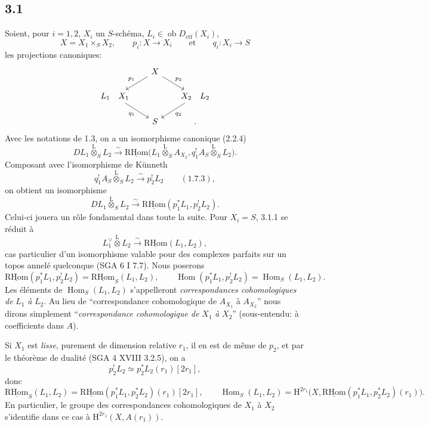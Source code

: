 \documentclass[11pt]{article}
\renewcommand{\H}{\mathrm{H}}
\DeclareMathOperator{\Hom}{Hom}
\newcommand{\R}{\mathrm{R}}\newcommand{\RHomCore}{\mathrm{RHom}}
\newcommand{\ob}{\operatorname{ob}}
\providecommand{\RHom}{\RHomCore}
\providecommand{\uRHom}{\underline{\RHom}}
\providecommand{\Dctf}{D_{\mathrm{ctf}}}
\providecommand{\Dctf}{D_{\mathrm{ctf}}}
\providecommand{\RHom}{\RHomCore}
\providecommand{\Hom}{\operatorname{Hom}}
\providecommand{\ob}{\operatorname{ob}}
\providecommand{\RHom}{\R\mathcal{H}om}
\providecommand{\R}{\mathrm R}
\providecommand{\RHom}{\RHomCore}
\providecommand{\Hom}{\operatorname{Hom}}
\begin{document}
\subsection*{3.1}
Soient, pour $i=1,2$, $X_i$ un $S$-schéma, $L_i\in\ob\Dctf(X_i)$,
\[
X=X_1\times_S X_2,
\qquad
p_i:X\longrightarrow X_i
\qquad\text{et}\qquad
q_i:X_i\longrightarrow S
\]
les projections canoniques:
\[
\begin{tikzcd}[column sep=1.8em,row sep=1.5em]
& X \arrow[dl,"p_1"'] \arrow[dr,"p_2"] & \\
L_1\quad X_1 \arrow[dr,"q_1"'] & & X_2\quad L_2 \arrow[dl,"q_2"] \\
& S & .
\end{tikzcd}
\]
Avec les notations de 1.3, on a un isomorphisme canonique (2.2.4)
\[
DL_1\overset{\mathrm{L}}{\otimes}_S L_2
\xrightarrow{\sim}
\uRHom\bigl(L_1\overset{\mathrm{L}}{\otimes}_S A_{X_2},
q_1^!A_S\overset{\mathrm{L}}{\otimes}_S L_2\bigr).
\]
Composant avec l'isomorphisme de Künneth
\[
q_1^!A_S\overset{\mathrm{L}}{\otimes}_S L_2
\xrightarrow{\sim}p_2^!L_2 \qquad (1.7.3),
\]
on obtient un isomorphisme
\begin{equation}
DL_1\overset{\mathrm{L}}{\otimes}_S L_2
\xrightarrow{\sim}
\uRHom(p_1^*L_1,p_2^!L_2).
\tag{3.1.1}
\end{equation}
Celui-ci jouera un rôle fondamental dans toute la suite. Pour $X_i=S$, 3.1.1 se réduit à
\[
L_1^\vee\overset{\mathrm{L}}{\otimes}L_2\xrightarrow{\sim}\uRHom(L_1,L_2),
\]
cas particulier d'un isomorphisme valable pour des complexes parfaits sur un topos annelé quelconque (SGA 6 I 7.7). Nous poserons
\begin{equation}
\uRHom(p_1^*L_1,p_2^!L_2)=\uRHom_S(L_1,L_2),
\qquad
\Hom(p_1^*L_1,p_2^!L_2)=\Hom_S(L_1,L_2).
\tag{3.1.2}
\end{equation}
Les éléments de $\Hom_S(L_1,L_2)$ s'appelleront \emph{correspondances cohomologiques de} $L_1$ \emph{à} $L_2$. Au lieu de ``correspondance cohomologique de $A_{X_1}$ à $A_{X_2}$'' nous dirons simplement ``\emph{correspondance cohomologique de} $X_1$ \emph{à} $X_2$'' (sous-entendu: à coefficients dans $A$).

Si $X_1$ est \emph{lisse}, purement de dimension relative $r_1$, il en est de même de $p_2$, et par le théorème de dualité (SGA 4 XVIII 3.2.5), on a
\[
p_2^!L_2\simeq p_2^*L_2(r_1)[2r_1],
\]
donc
\begin{equation}
\uRHom_S(L_1,L_2)=\uRHom(p_1^*L_1,p_2^*L_2)(r_1)[2r_1],
\qquad
\Hom_S(L_1,L_2)=\H^{2r_1}\bigl(X,\uRHom(p_1^*L_1,p_2^*L_2)(r_1)\bigr).
\tag{3.1.3}
\end{equation}
En particulier, le groupe des correspondances cohomologiques de $X_1$ à $X_2$ s'identifie dans ce cas à $\H^{2r_1}(X,A(r_1))$.
\end{document}
